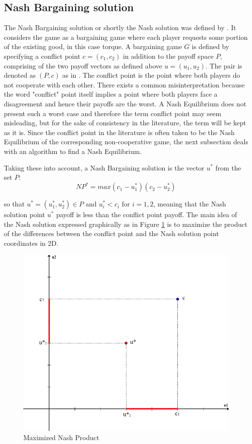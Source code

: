 \subsection{Nash Bargaining solution}
The Nash Bargaining solution or shortly the Nash solution was defined by \citet{nash1950bargaining}. It considers the game as a bargaining game where each player requests some portion of the existing good, in this case torque. A bargaining game $G$ is defined by specifying a conflict point $c = (c_1,c_2)$ in addition to the payoff space $P$, comprising of the two payoff vectors as defined above $u = (u_1,u_2)$. The pair is denoted as $(P,c)$ as in \citet{holler2006einfuhrung}. The conflict point is the point where both players do not cooperate with each other. There exists a common misinterpretation because the word "conflict" point itself implies a point where both players face a disagreement and hence their payoffs are the worst. A Nash Equilibrium does not present such a worst case and therefore the term conflict point may seem misleading, but for the sake of consistency in the literature, the term will be kept as it is. Since the conflict point in the literature is often taken to be the Nash Equilibrium of the corresponding non-cooperative game, the next subsection deals with an algorithm to find a Nash Equilibrium.

Taking these into account, a Nash Bargaining solution is the vector $u^*$ from the set $P$:
\begin{equation}
NP^* = max(c_1 - u_1^* )(c_2 - u_2^*)
\end{equation}

so that $u^* = (u_1^*,u_2^*) \in P$ and $u_i^* < c_i$ for $i = 1,2$, meaning that the Nash solution point $u^*$ payoff is less than the conflict point payoff. The main idea of the Nash solution expressed graphically as in Figure \ref{fig:nashSol} is to maximize the product of the differences between the conflict point and the Nash solution point coordinates in 2D.

\begin{figure}[h]
\centering
\includegraphics[scale=0.5]{figures/nashSolution}
\caption{Maximized Nash Product}
\label{fig:nashSol}
\end{figure}


